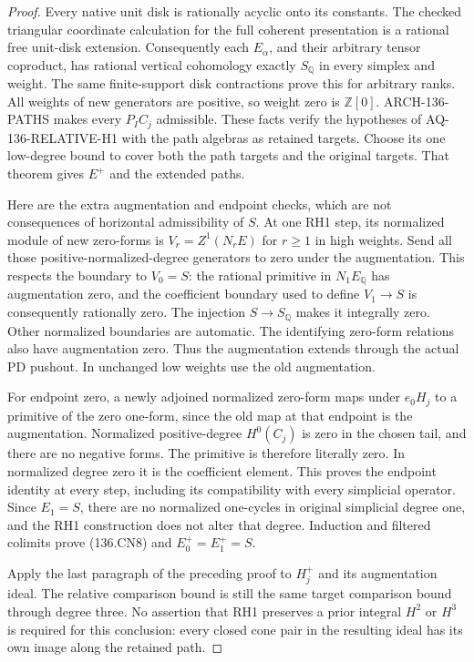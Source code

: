 \begin{proof}
Every native unit disk is rationally acyclic onto its constants.
The checked triangular coordinate calculation for the full
coherent presentation is a rational free unit-disk extension.
Consequently each \(E_\alpha\), and their arbitrary tensor
coproduct, has rational vertical cohomology exactly \(S_{\mathbb Q}\)
in every simplex and weight.  The same finite-support disk
contractions prove this for arbitrary ranks.  All weights of
new generators are positive, so weight zero is \(\mathbb Z[0]\).
ARCH-136-PATHS makes every \(P_I C_j\) admissible.  These
facts verify the hypotheses of AQ-136-RELATIVE-H1 with the
path algebras as retained targets.  Choose its one low-degree
bound to cover both the path targets and the original targets.
That theorem gives \(E^+\) and the extended paths.

Here are the extra augmentation and endpoint checks, which are
not consequences of horizontal admissibility of \(S\).
At one RH1 step, its normalized module of new zero-forms is
\(V_r=Z^1(N_r E)\) for \(r\geq1\) in high weights.
Send all those positive-normalized-degree generators to zero
under the augmentation.  This respects the boundary to
\(V_0=S\): the rational primitive in \(N_1E_{\mathbb Q}\)
has augmentation zero, and the coefficient boundary used to
define \(V_1\to S\) is consequently rationally zero.
The injection \(S\to S_{\mathbb Q}\) makes it integrally
zero.  Other normalized
boundaries are automatic.  The identifying zero-form relations
also have augmentation zero.  Thus the augmentation extends
through the actual PD pushout.  In unchanged low weights use
the old augmentation.

For endpoint zero, a newly adjoined normalized zero-form maps
under \(e_0H_j\) to a primitive of the zero one-form,
since the old map at that endpoint is the augmentation.
Normalized positive-degree \(H^0(C_j)\) is zero in the
chosen tail, and there are no negative forms.  The primitive
is therefore literally zero.  In normalized degree zero it
is the coefficient element.  This proves the endpoint identity
at every step, including its compatibility with every simplicial
operator.  Since \(E_1=S\), there are no normalized one-cycles
in original simplicial degree one, and the RH1 construction
does not alter that degree.  Induction and filtered colimits
prove (136.CN8) and \(E^+_0=E^+_1=S\).

Apply the last paragraph of the preceding proof to \(H_j^+\)
and its augmentation ideal.  The relative comparison bound is
still the same target comparison bound through degree three.  No assertion
that RH1 preserves a prior integral \(H^2\) or \(H^3\)
is required for this conclusion: every closed cone pair in the
resulting ideal has its own image along the retained path.
\end{proof}

